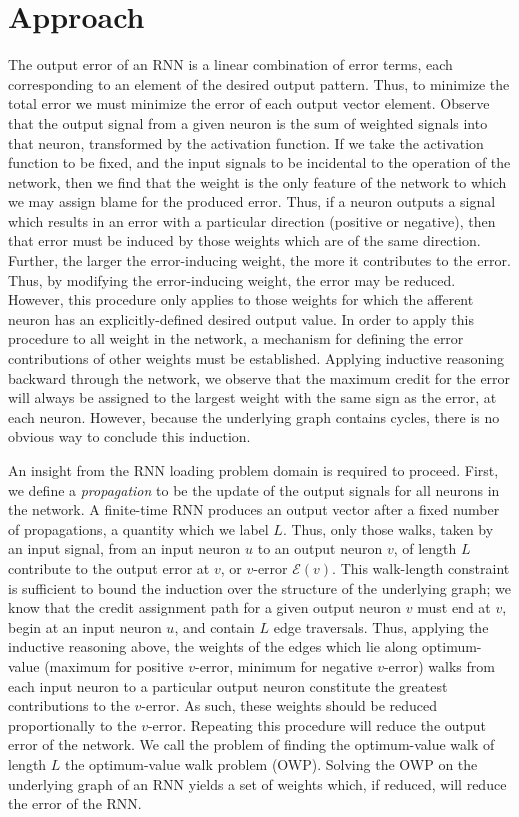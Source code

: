 \documentclass[journal]{IEEEtran}
\begin{document}
\section{Approach}
The output error of an RNN is a linear combination of error terms, each corresponding to an element of the desired output pattern. Thus, to minimize the total error we must minimize the error of each output vector element. Observe that the output signal from a given neuron is the sum of weighted signals into that neuron, transformed by the activation function. If we take the activation function to be fixed, and the input signals to be incidental to the operation of the network, then we find that the weight is the only feature of the network to which we may assign blame for the produced error. Thus, if a neuron outputs a signal which results in an error with a particular direction (positive or negative), then that error must be induced by those weights which are of the same direction. Further, the larger the error-inducing weight, the more it contributes to the error. Thus, by modifying the error-inducing weight, the error may be reduced. However, this procedure only applies to those weights for which the afferent neuron has an explicitly-defined desired output value. In order to apply this procedure to all weight in the network, a mechanism for defining the error contributions of other weights must be established. Applying inductive reasoning backward through the network, we observe that the maximum credit for the error will always be assigned to the largest weight with the same sign as the error, at each neuron. However, because the underlying graph contains cycles, there is no obvious way to conclude this induction. 

An insight from the RNN loading problem domain is required to proceed. First, we define a \emph{propagation} to be the update of the output signals for all neurons in the network. A finite-time RNN produces an output vector after a fixed number of propagations, a quantity which we label $L$. Thus, only those walks, taken by an input signal, from an input neuron $u$ to an output neuron $v$, of length $L$ contribute to the output error at $v$, or $v$-error $\mathcal{E}(v)$. This walk-length constraint is sufficient to bound the induction over the structure of the underlying graph; we know that the credit assignment path for a given output neuron $v$ must end at $v$, begin at an input neuron $u$, and contain $L$ edge traversals. Thus, applying the inductive reasoning above, the weights of the edges which lie along optimum-value (maximum for positive $v$-error, minimum for negative $v$-error) walks from each input neuron to a particular output neuron constitute the greatest contributions to the $v$-error. As such, these weights should be reduced proportionally to the $v$-error. Repeating this procedure will reduce the output error of the network. We call the problem of finding the optimum-value walk of length $L$ the optimum-value walk problem (OWP). Solving the OWP on the underlying graph of an RNN yields a set of weights which, if reduced, will reduce the error of the RNN.
\end{document}
